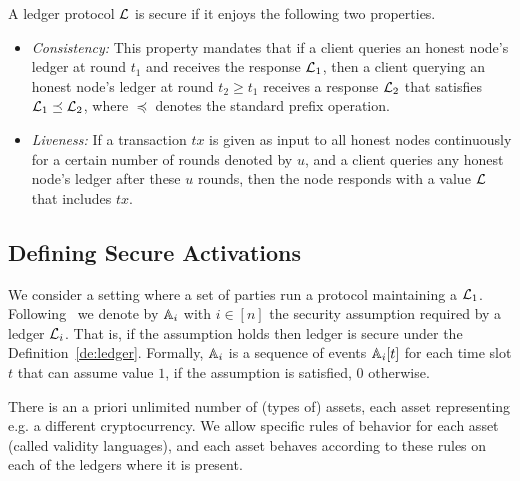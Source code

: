 \begin{definition}\label{de:ledger} A ledger protocol $\mathcal{L}$ is secure if it enjoys the following two properties.
\begin{itemize}

\item {\em Consistency:} This property mandates that if a client queries
an honest node's ledger at round $t_1$  
and receives the response $\mathcal{L}_1$, 
then a client querying an honest node's ledger at round $t_2\geq t_1 $
 receives a response $\mathcal{L}_2$ that satisfies $\mathcal{L}_1 \preceq \mathcal{L}_2$, 
where $\preceq$ denotes the standard prefix operation. 

\item {\em Liveness:} If a transaction $tx$ is given as input to all honest
nodes continuously for a certain number of rounds denoted by $u$, 
and a client queries any honest node's ledger
after these $u$ rounds, then the node responds with a value
$\mathcal{L}$ that includes $tx$.

\end{itemize}

\end{definition}

\subsection{Defining Secure Activations}
We consider a setting where a set of parties run a protocol maintaining a $\mathcal{L}_1$. Following~\cite{sidechain} we denote by $\mathbb{A}_i$
with $i\in[n]$ the security assumption required by a ledger $\mathcal{L}_i$. That is, if the assumption holds then ledger is secure under the Definition~\ref{de:ledger}.
Formally, $\mathbb{A}_i$ is a sequence of events $\mathbb{A}_i[t]$ for each time slot $t$ that can assume value $1$, if the assumption is satisfied, $0$ otherwise.

There is an a priori unlimited number of (types of) assets, each asset representing e.g. a different cryptocurrency. We allow specific rules of behavior for each asset (called validity languages), and each asset behaves according to these rules on each of the ledgers where it is present.

